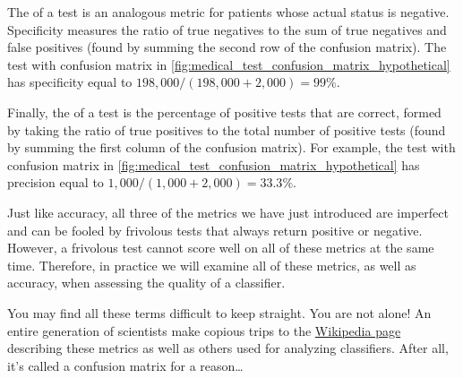 The  of a test is an analogous metric for patients whose actual status is negative. Specificity measures the ratio of true negatives to the sum of true negatives and false positives (found by summing the second row of the confusion matrix). The test with confusion matrix in \autoref{fig:medical_test_confusion_matrix_hypothetical} has specificity equal to $198,000/(198,000 + 2,000) = 99\%$.

Finally, the  of a test is the percentage of positive tests that are correct, formed by taking the ratio of true positives to the total number of positive tests (found by summing the first column of the confusion matrix). For example, the test with confusion matrix in \autoref{fig:medical_test_confusion_matrix_hypothetical} has precision equal to $1,000/(1,000 + 2,000) = 33.3\%$.\\

\begin{qbox}\end{qbox}

Just like accuracy, all three of the metrics we have just introduced are imperfect and can be fooled by frivolous tests that always return positive or negative. However, a frivolous test cannot score well on all of these metrics at the same time. Therefore, in practice we will examine all of these metrics, as well as accuracy, when assessing the quality of a classifier.\\

\begin{qbox}\end{qbox}

You may find all these terms difficult to keep straight. You are not alone! An entire generation of scientists make copious trips to the \href{https://en.wikipedia.org/wiki/Precision_and_recall#Definition_(classification_context)}{Wikipedia page} describing these metrics as well as others used for analyzing classifiers. After all, it's called a confusion matrix for a reason\ldots


